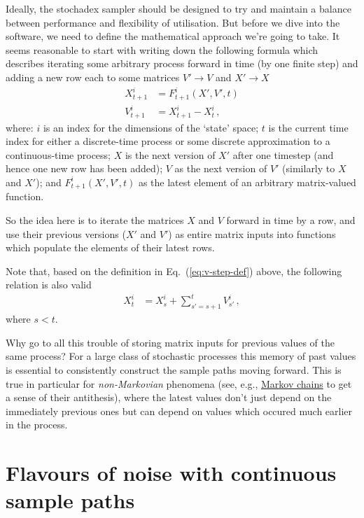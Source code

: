 \documentclass{book}
\begin{document}
Ideally, the stochadex sampler should be designed to try and maintain a balance between performance and flexibility of utilisation. But before we dive into the software, we need to define the mathematical approach we're going to take. It seems reasonable to start with writing down the following formula which describes iterating some arbitrary process forward in time (by one finite step) and adding a new row each to some matrices $V' \rightarrow V$ and $X' \rightarrow X$
\begin{align}
X^{i}_{t+1} &= F^{i}_{t+1}(X', V', t) \label{eq:x-step-def}\\
V^{i}_{t+1} &= X^{i}_{t+1} - X^{i}_{t} \label{eq:v-step-def}\,,
\end{align}
where: $i$ is an index for the dimensions of the `state' space; $t$ is the current time index for either a discrete-time process or some discrete approximation to a continuous-time process; $X$ is the next version of $X'$ after one timestep (and hence one new row has been added); $V$ as the next version of $V'$ (similarly to $X$ and $X'$); and $F^i_{t+1}(X', V', t)$ as the latest element of an arbitrary matrix-valued function.

So the idea here is to iterate the matrices $X$ and $V$ forward in time by a row, and use their previous versions ($X'$ and $V'$) as entire matrix inputs into functions which populate the elements of their latest rows.

Note that, based on the definition in Eq.~(\ref{eq:v-step-def}) above, the following relation is also valid
\begin{align}
X^{i}_{t} &= X_{s}^{i} + \sum_{s'=s+1}^{t}V_{s'}^{i} \label{eq:x-implicit-solution} \,,
\end{align}
where $s<t$.

Why go to all this trouble of storing matrix inputs for previous values of the same process? For a large class of stochastic processes this memory of past values is essential to consistently construct the sample paths moving forward. This is true in particular for \emph{non-Markovian} phenomena (see, e.g., \href{https://en.wikipedia.org/wiki/Markov_chain}{Markov chains} to get a sense of their antithesis), where the latest values don't just depend on the immediately previous ones but can depend on values which occured much earlier in the process.

\section{\sffamily Flavours of noise with continuous sample paths}
\end{document}
